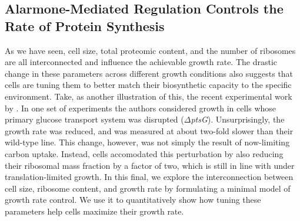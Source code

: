 



\subsection{Alarmone-Mediated Regulation Controls the Rate of Protein Synthesis}

As we have seen, cell size, total proteomic content, and the number of ribosomes
are all interconnected and influence the achievable growth rate. The drastic
change in these parameters across different growth conditions also suggests that
cells are tuning them to better match their biosynthetic capacity to the
specific environment. Take, as another illustration of this, the recent
experimental work by \cite{dai2016}. In one set of experiments the authors
considered growth in cells whose  primary glucose transport system was disrupted
($\Delta$\textit{ptsG}). Unsurprisingly, the growth rate was reduced, and was
measured at about two-fold slower than their wild-type line.  This change,
however, was not simply the result of now-limiting carbon uptake. Instead, cells
accomodated this perturbation by also reducing their ribosomal mass fraction by
a factor of two, which is still in line with 
under translation-limited growth.  In this final, we explore the interconnection
between cell size, ribosome content, and growth rate by formulating a minimal
model of growth rate control.  We use it to quantitatively show how tuning these
parameters help cells maximize their growth rate.

